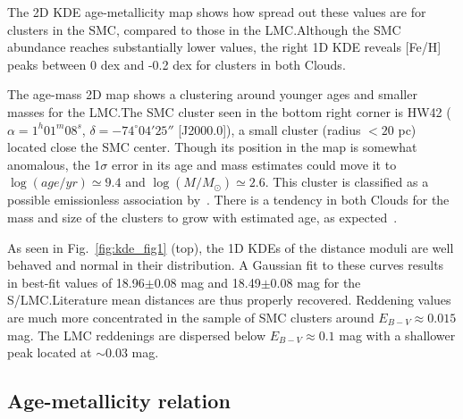 \documentclass[draft]{aa}
\begin{document}
The 2D KDE age-metallicity map shows how spread out these values are for
clusters in the SMC, compared to those in the LMC.\@ Although the SMC abundance
reaches substantially lower values, the right 1D KDE reveals [Fe/H] peaks
between 0 dex and -0.2 dex for clusters in both Clouds.

The age-mass 2D map shows a clustering around younger ages and smaller masses
for the LMC.\@ The SMC cluster seen in the bottom right corner is HW42
($\alpha{=}1^h01^m08^s$, $\delta{=}-74^\circ04'25''$ [J2000.0]),
a small cluster (radius ${<}20$ pc) located close the SMC center. Though
its position in the map is somewhat anomalous, the 1$\sigma$ error in its age
and mass estimates could move it to
$\log(age/yr){\simeq}9.4$ and $\log(M/M_{\odot}){\simeq}2.6$. This cluster is
classified as a possible emissionless association by~\mbox{\cite{Bica_1995}}.
%
There is a tendency in both Clouds for the mass and size of the clusters to
grow with estimated age, as expected~\citep[due to the mass-to-light ratio
increase with age; see][Sect. 4]{Popescu_2012}.

As seen in Fig.~\ref{fig:kde_fig1} (top), the 1D KDEs of the distance
moduli are well behaved and normal in their distribution.
A Gaussian fit to these curves results in best-fit values of 18.96$\pm$0.08 mag
and 18.49$\pm$0.08 mag for the S/LMC.\@ Literature mean distances are thus
properly recovered.
%
Reddening values are much more concentrated in the sample of SMC clusters
around $E_{B-V}{\approx}0.015$ mag. The LMC reddenings are dispersed below $E_{B-V}
{\approx}0.1$ mag with a shallower peak located at ${\sim}0.03$ mag.
%


\subsection{Age-metallicity relation}
\label{ssec:amr}
\end{document}
